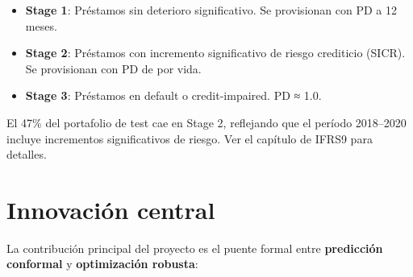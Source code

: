 \documentclass[
  spanish,
  11pt,
  letterpaper,
]{scrbook}
\providecommand{\tightlist}{%
  \setlength{\itemsep}{0pt}\setlength{\parskip}{0pt}}
\theoremstyle{plain}
\theoremstyle{remark}
\begin{document}
\begin{tcolorbox}[enhanced jigsaw, arc=.35mm, bottomrule=.15mm, bottomtitle=1mm, breakable, colback=white, colbacktitle=quarto-callout-note-color!10!white, colframe=quarto-callout-note-color-frame, coltitle=black, left=2mm, leftrule=.75mm, opacityback=0, opacitybacktitle=0.6, rightrule=.15mm, title=\textcolor{quarto-callout-note-color}{\faInfo}\hspace{0.5em}{¿Qué son los Stages IFRS9?}, titlerule=0mm, toprule=.15mm, toptitle=1mm]

\begin{itemize}
\tightlist
\item
  \textbf{Stage 1}: Préstamos sin deterioro significativo. Se
  provisionan con PD a 12 meses.
\item
  \textbf{Stage 2}: Préstamos con incremento significativo de riesgo
  crediticio (SICR). Se provisionan con PD de por vida.
\item
  \textbf{Stage 3}: Préstamos en default o credit-impaired. PD ≈ 1.0.
\end{itemize}

El 47\% del portafolio de test cae en Stage 2, reflejando que el período
2018--2020 incluye incrementos significativos de riesgo. Ver el capítulo
de IFRS9 para detalles.

\end{tcolorbox}

\section{Innovación central}\label{innovaciuxf3n-central}

La contribución principal del proyecto es el puente formal entre
\textbf{predicción conformal} y \textbf{optimización robusta}:
\end{document}
